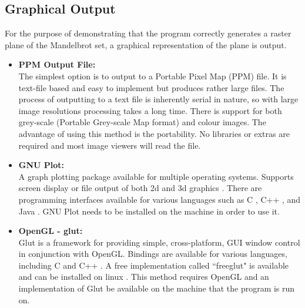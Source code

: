 \subsection*{Graphical Output}
For the purpose of demonstrating that the program correctly generates a raster plane
of the Mandelbrot set, a graphical representation of the plane is output.

\begin{itemize}
\item \textbf{PPM Output File:} \\
              The simplest option is to output to a Portable Pixel Map (PPM) file. It is 
              text-file based and easy to implement but produces rather large files. 
              The process of outputting to a text file is inherently serial in nature,
              so with large image resolutions processing takes a long time.
              There is support for both grey-scale (Portable Grey-scale Map format) and colour images. 
              The advantage of using this method is the portability. No libraries or extras are required
              and most image viewers will read the file. \cite{ppmspec}
              
\item \textbf{GNU Plot:} \\
              A graph plotting package available for multiple operating systems. 
              Supports screen display or file output of both 2d and 3d graphics \cite{gnuplot}.
              There are programming interfaces available for various languages such as C \cite{gnuplotcint}, C++ \cite{gnuplotcppint}, 
              and Java \cite{gnuplotjint}.
              GNU Plot needs to be installed on the machine in order to use it.
              
\item \textbf{OpenGL - glut:} \\
              Glut is a framework for providing simple, cross-platform, GUI window control in conjunction
              with OpenGL. Bindings are available for various languages, including C and C++ \cite{openglglut}.
              A free implementation called ``freeglut" is available and can be installed on linux \cite{freeglut}.
              This method requires OpenGL and an implementation of Glut be available on the machine that the program 
              is run on.
              
\end{itemize}



